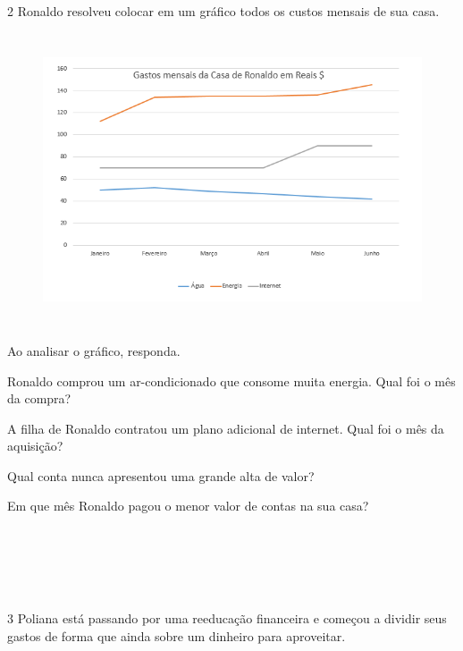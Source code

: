 {{\num{2} Ronaldo resolveu colocar em um gráfico todos os custos mensais de sua casa.

\begin{figure}[H]
\centering\includegraphics[width=5.30833in,height=3.41384in]{./imgSAEB_8_MAT/media/image40.png}
\end{figure}

Ao analisar o gráfico, responda.

\begin{escolha}[itemsep=0pt]
\item Ronaldo comprou um ar-condicionado que consome muita energia. Qual foi o mês da compra?
\item A filha de Ronaldo contratou um plano adicional de internet. Qual foi o mês da aquisição?
\item Qual conta nunca apresentou uma grande alta de valor?
\item Em que mês Ronaldo pagou o menor valor de contas na sua casa?
\end{escolha}

\\
\\
\\
\\

\pagebreak

\num{3} Poliana está passando por uma reeducação financeira e começou a
dividir seus gastos de forma que ainda sobre um dinheiro para
aproveitar.

}}
